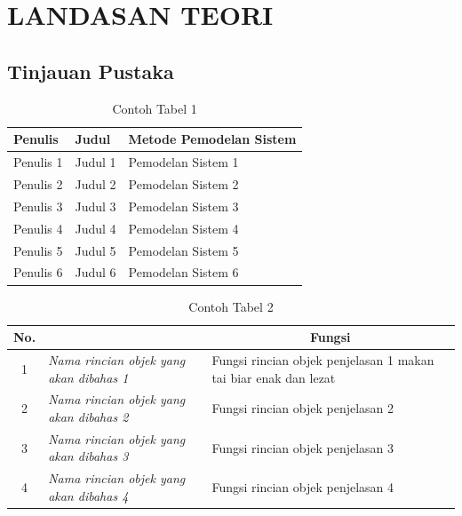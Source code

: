 \chapter[LANDASAN TEORI]{\\ LANDASAN TEORI}

\section{Tinjauan Pustaka}
\lipsum[1]

\begin{table}[H]
    \centering
    \caption{Contoh Tabel 1}
    \label{t risetPemodelan}
    \begin{tabularx}{\linewidth}{
        |p{}%
        |p{}%
        |p{}|%
    }
        \hline
        Penulis & Judul & Metode Pemodelan Sistem\\ \hline
        Penulis 1 & Judul 1 & Pemodelan Sistem 1 \\ \hline
        Penulis 2 & Judul 2 & Pemodelan Sistem 2 \\ \hline
        Penulis 3 & Judul 3 & Pemodelan Sistem 3 \\ \hline
        Penulis 4 & Judul 4 & Pemodelan Sistem 4 \\ \hline
        Penulis 5 & Judul 5 & Pemodelan Sistem 5 \\ \hline
        Penulis 6 & Judul 6 & Pemodelan Sistem 6 \\ \hline
    \end{tabularx}
\end{table}

\begin{table}[H]
    \centering
    \caption{Contoh Tabel 2}
    \label{t blok}
    \begin{tabular}{|c|l|l|}
        \hline
        \rowcolor[HTML]{C0C0C0} 
        {\color[HTML]{000000} No.} & \multicolumn{1}{c|}{\cellcolor[HTML]{C0C0C0}{\color[HTML]{000000} Nama}} & \multicolumn{1}{c|}{\cellcolor[HTML]{C0C0C0}Fungsi}  \\ \hline
        \rowcolor[HTML]{FFFFFF} 
        1 & \textit{Nama rincian objek yang akan dibahas 1} & Fungsi rincian objek penjelasan 1 makan tai biar enak dan lezat \\ \hline
        2 & \textit{Nama rincian objek yang akan dibahas 2} & Fungsi rincian objek penjelasan 2 \\ \hline
        3 & \textit{Nama rincian objek yang akan dibahas 3} & Fungsi rincian objek penjelasan 3 \\ \hline   
        4 & \textit{Nama rincian objek yang akan dibahas 4} & Fungsi rincian objek penjelasan 4 \\ \hline
    \end{tabular}
\end{table}

